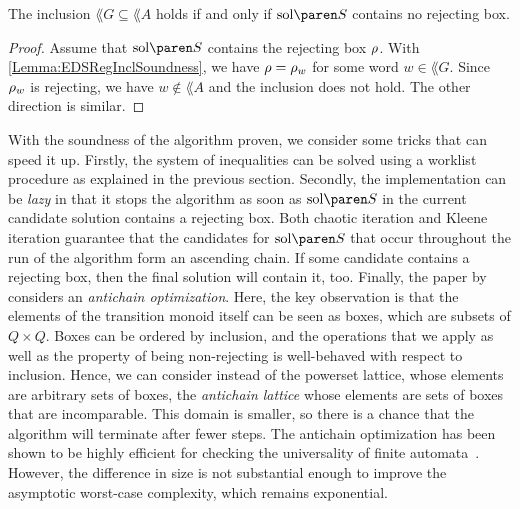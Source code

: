 \documentclass[../../diss.tex]{subfiles}
\begin{document}

\begin{proposition}%
\label{Proposition:EDSRegInclSoundness}%
    The inclusion $\lang{G} \subseteq \lang{A}$ holds if and only if $\sol{S}$ contains no rejecting box.
\end{proposition}

\begin{proof}
    Assume that $\sol{S}$ contains the rejecting box $\tbox$.
    With \cref{Lemma:EDSRegInclSoundness}, we have $\tbox = \tbox{w}$ for some word $w \in \lang{G}$.
    Since $\tbox{w}$ is rejecting, we have $w \not\in \lang{A}$ and the inclusion does not hold.
    The other direction is similar.
\end{proof}

With the soundness of the algorithm proven, we consider some tricks that can speed it up.
Firstly, the system of inequalities can be solved using a worklist procedure as explained in the previous section.
Secondly, the implementation can be \emph{lazy} in that it stops the algorithm as soon as $\sol{S}$ in the current candidate solution contains a rejecting box.
Both chaotic iteration and Kleene iteration guarantee that the candidates for $\sol{S}$ that occur throughout the run of the algorithm form an ascending chain.
If some candidate contains a rejecting box, then the final solution will contain it, too.
Finally, the paper by  considers an \emph{antichain optimization}.
Here, the key observation is that the elements of the transition monoid itself can be seen as boxes, which are subsets of $Q \times Q$.
Boxes can be ordered by inclusion, and the operations that we apply as well as the property of being non-rejecting is well-behaved with respect to inclusion.
Hence, we can consider instead of the powerset lattice, whose elements are arbitrary sets of boxes, the \emph{antichain lattice} whose elements are sets of boxes that are incomparable.
This domain is smaller, so there is a chance that the algorithm will terminate after fewer steps.
The antichain optimization has been shown to be highly efficient \eg for checking the universality of finite automata~\cite{CaludeJKLS17}.
However, the difference in size is not substantial enough to improve the asymptotic worst-case complexity, which remains exponential.
\end{document}
